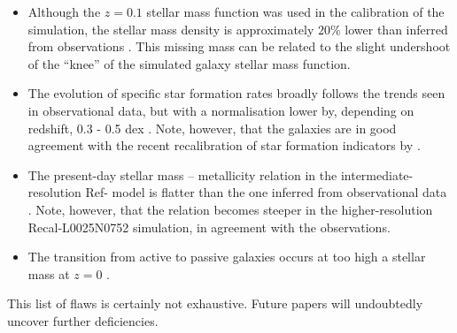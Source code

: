 \begin{itemize}
\item Although the $z=0.1$ stellar mass function was used in the calibration of
  the simulation, the stellar mass density is approximately $20\%$ lower than
  inferred from observations \citep{Schaye2015,Furlong2015}. This missing mass
  can be related to the slight undershoot of the ``knee'' of the simulated
  galaxy stellar mass function.

\item The evolution of specific star formation rates broadly follows the trends
  seen in observational data, but with a normalisation lower by, depending on
  redshift, 0.3 - 0.5 dex \citep{Schaye2015, Furlong2015}. Note, however, that
  the \eagle galaxies are in good agreement with the recent recalibration of
  star formation indicators by \cite{Chang2015} \citep[see Fig. 5 of ][]{Schaller2015b}.

\item The present-day stellar mass -- metallicity relation in the
  intermediate-resolution Ref- model is flatter than the one inferred from
  observational data \citep{Schaye2015}.  Note, however, that the relation
  becomes steeper in the higher-resolution Recal-L0025N0752 simulation, in
  agreement with the observations.

\item The transition from active to passive galaxies occurs at too high a
  stellar mass at $z=0$ \citep{Schaye2015, Trayford2015}.

\end{itemize}

This list of flaws is certainly not exhaustive. Future papers will
undoubtedly uncover further deficiencies.

